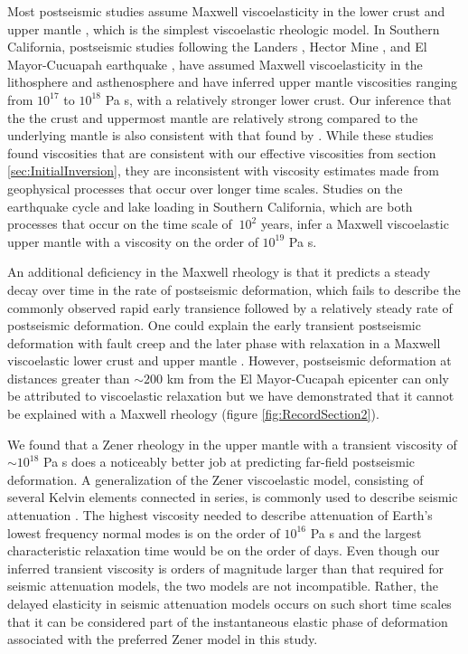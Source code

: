 \documentclass[1p]{elsarticle}
\begin{document}
Most postseismic studies assume Maxwell viscoelasticity in the lower crust and upper mantle \citep[e.g.][]{Nur1974,Pollitz2000,Hetland2003,Freed2006a,Johnson2009,Hearn2009}, which is the simplest viscoelastic rheologic model.  In Southern California, postseismic studies following the Landers \citep{Pollitz2000}, Hector Mine \citep{Pollitz2001}, and El Mayor-Cucuapah earthquake \citep{Spinler2015,Rollins2015}, have assumed Maxwell viscoelasticity in the lithosphere and asthenosphere and have inferred upper mantle viscosities ranging from $10^{17}$ to $10^{18}$ Pa s, with a relatively stronger lower crust. Our inference that the the crust and uppermost mantle are relatively strong compared to the underlying mantle is also consistent with that found by \citet{Freed2007a}.  While these studies found viscosities that are consistent with our effective viscosities from section \ref{sec:InitialInversion}, they are inconsistent with viscosity estimates made from geophysical processes that occur over longer time scales. Studies on the earthquake cycle \citep{Lundgren2009} and lake loading \citep{Luttrell2007} in Southern California, which are both processes that occur on the time scale of $~10^2$ years, infer a Maxwell viscoelastic upper mantle with a viscosity on the order of $10^{19}$ Pa s. 

An additional deficiency in the Maxwell rheology is that it predicts a steady decay over time in the rate of postseismic deformation, which fails to describe the commonly observed rapid early transience followed by a relatively steady rate of postseismic deformation.  One could explain the early transient postseismic deformation with fault creep and the later phase with relaxation in a Maxwell viscoelastic lower crust and upper mantle \citep[e.g][]{Hearn2009,Johnson2009}. However, postseismic deformation at distances greater than $\sim200$ km from the El Mayor-Cucapah epicenter can only be attributed to viscoelastic relaxation \citep{Freed2007a} but we have demonstrated that it cannot be explained with a Maxwell rheology (figure \ref{fig:RecordSection2}). 

We found that a Zener rheology in the upper mantle with a transient viscosity of $\sim10^{18}$ Pa s does a noticeably better job at predicting far-field postseismic deformation.  A generalization of the Zener viscoelastic model, consisting of several Kelvin elements connected in series, is commonly used to describe seismic attenuation \citep{Liu1976}.  The highest viscosity needed to describe attenuation of Earth's lowest frequency normal modes is on the order of $10^{16}$ Pa s \citep{Yuen1982} and the largest characteristic relaxation time would be on the order of days. Even though our inferred transient viscosity is orders of magnitude larger than that required for seismic attenuation models, the two models are not incompatible.  Rather, the delayed elasticity in seismic attenuation models occurs on such short time scales that it can be considered  part of the instantaneous elastic phase of deformation associated with the preferred Zener model in this study. 
\end{document}
